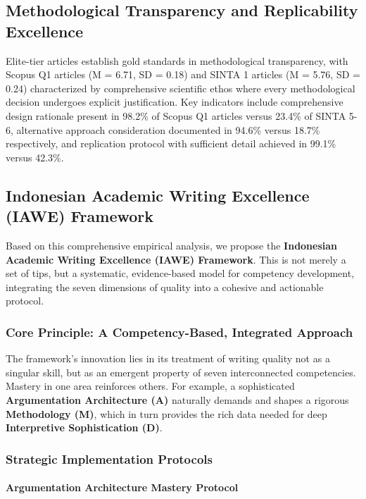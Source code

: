 \documentclass[journal,article,submit,pdftex,moreauthors]{Definitions/mdpi}
\begin{document}
\subsection{Methodological Transparency and Replicability Excellence}

Elite-tier articles establish gold standards in methodological transparency, with Scopus Q1 articles (M = 6.71, SD = 0.18) and SINTA 1 articles (M = 5.76, SD = 0.24) characterized by comprehensive scientific ethos where every methodological decision undergoes explicit justification. Key indicators include comprehensive design rationale present in 98.2\% of Scopus Q1 articles versus 23.4\% of SINTA 5-6, alternative approach consideration documented in 94.6\% versus 18.7\% respectively, and replication protocol with sufficient detail achieved in 99.1\% versus 42.3\%.

\subsection{Indonesian Academic Writing Excellence (IAWE) Framework}

Based on this comprehensive empirical analysis, we propose the \textbf{Indonesian Academic Writing Excellence (IAWE) Framework}. This is not merely a set of tips, but a systematic, evidence-based model for competency development, integrating the seven dimensions of quality into a cohesive and actionable protocol.

\subsubsection{Core Principle: A Competency-Based, Integrated Approach}

The framework's innovation lies in its treatment of writing quality not as a singular skill, but as an emergent property of seven interconnected competencies. Mastery in one area reinforces others. For example, a sophisticated \textbf{Argumentation Architecture (A)} naturally demands and shapes a rigorous \textbf{Methodology (M)}, which in turn provides the rich data needed for deep \textbf{Interpretive Sophistication (D)}.

\subsubsection{Strategic Implementation Protocols}

\paragraph{Argumentation Architecture Mastery Protocol}
\end{document}
